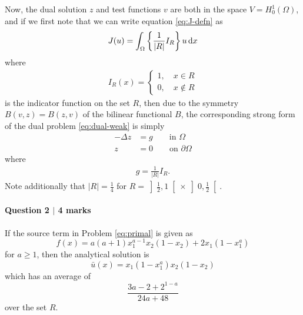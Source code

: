\begin{solution}
Now, the dual solution $z$ and test functions $v$ are both in the space $V = H_0^1(\Omega)$, and if we first note that we can write equation \eqref{eq:J-defn} as
\begin{align}\label{eq:J-indicator}
	J(u) = \int_\Omega \left\{ \frac{1}{|R|} I_R \right\} u \operatorname{d}\!{x}
\end{align}
where
\begin{align}\label{eq:indicator}
	I_R(x) = \begin{cases}
1, \quad x \in R \\
0, \quad x \not\in R
\end{cases}
\end{align}
is the indicator function on the set $R$, then due to the symmetry $B(v,z) = B(z,v)$ of the bilinear functional $B$, the corresponding strong form of the dual problem \eqref{eq:dual-weak} is simply
\begin{equation}\tag{P*}\label{eq:dual}
\begin{aligned}
-\Delta z &= g \qquad \text{in } \Omega\\
z &= 0 \qquad \text{on } \partial\Omega
\end{aligned}
\end{equation}
where
\begin{align*}
g = \frac{1}{|R|} I_R.
\end{align*}
Note additionally that $|R| = \frac{1}{4}$ for $R = \left]\frac{1}{2},1\right[ \times \left] 0,\frac{1}{2}\right[$.

\end{solution}

\newpage

\paragraph*{Question 2 $\vert$ 4 marks}%

If the source term in Problem \eqref{eq:primal} is given as
\begin{equation*}
f(x) = a(a+1)x_1^{a-1}x_2(1-x_2) +  2x_1(1-x_1^a)
\end{equation*}
for $a \geq 1$, then the analytical solution is
\begin{equation*}
\bar{u}(x) = x_1(1-x_1^a)x_2(1-x_2)
\end{equation*}
which has an average of
\begin{equation*}
\frac{3a-2+2^{1-a}}{24a+48}
\end{equation*}
over the set $R$.

